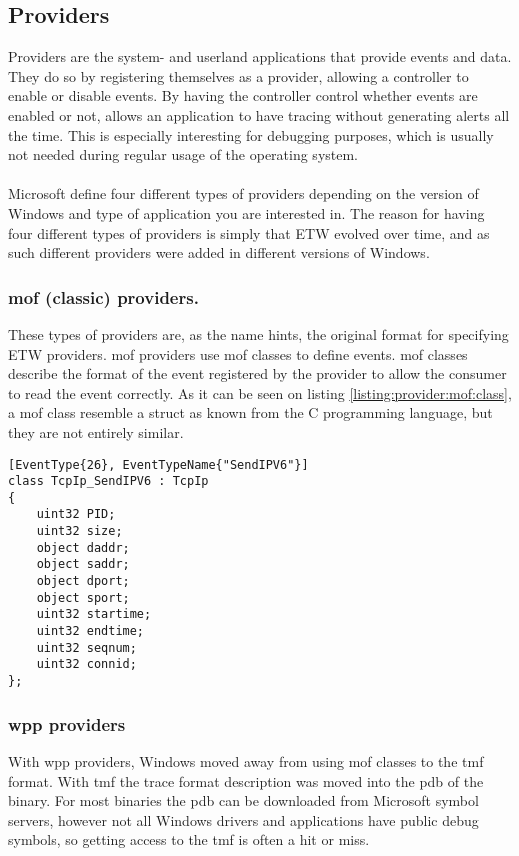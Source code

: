 \documentclass{report}
\begin{document}
\subsection{Providers}
\label{sec:etw:providers}
Providers are the system- and userland applications that provide events and data. They do so by registering themselves as a provider, allowing a controller to enable or disable events. By having the controller control whether events are enabled or not, allows an application to have tracing without generating alerts all the time. This is especially interesting for debugging purposes, which is usually not needed during regular usage of the operating system.
\\
\\
Microsoft define four different types of providers depending on the version of Windows and type of application you are interested in. The reason for having four different types of providers is simply that \gls{ETW} evolved over time, and as such different providers were added in different versions of Windows\cite{url:etw:provider-types}.

\subsubsection{\gls{mof} (classic) providers.}
These types of providers are, as the name hints, the original format for specifying \gls{ETW} providers. \gls{mof} providers use \gls{mof} classes\cite{url:etw:provider-types:mof:classes} to define events. \gls{mof} classes describe the format of the event registered by the provider to allow the consumer to read the event correctly. As it can be seen on listing \ref{listing:provider:mof:class}, a \gls{mof} class resemble a struct as known from the C programming language, but they are not entirely similar.

\begin{listing}[H]
\begin{verbatim}
[EventType{26}, EventTypeName{"SendIPV6"}]
class TcpIp_SendIPV6 : TcpIp
{
    uint32 PID;
    uint32 size;
    object daddr;
    object saddr;
    object dport;
    object sport;
    uint32 startime;
    uint32 endtime;
    uint32 seqnum;
    uint32 connid;
};
\end{verbatim}
\caption{\texttt{TcpIp_SendIPV6 : TcpIp} \gls{mof} class}
\label{listing:provider:mof:class}
\end{listing}

\subsubsection{\gls{wpp} providers}
With \gls{wpp} providers, Windows moved away from using \gls{mof} classes to the \gls{tmf} format. With \gls{tmf} the trace format description was moved into the \gls{pdb} of the binary. For most binaries the \gls{pdb} can be downloaded from Microsoft symbol servers\cite{url:microsoft:public-symbol-server}, however not all Windows drivers and applications have public debug symbols, so getting access to the \gls{tmf} is often a hit or miss.
\end{document}
